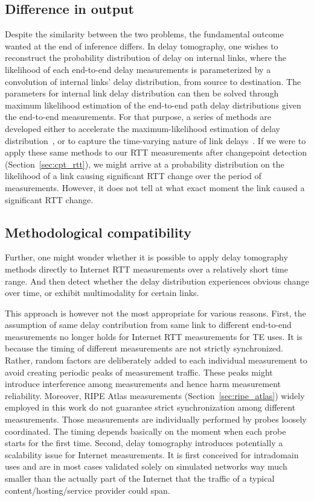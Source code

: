 \subsection{Difference in output}
Despite the similarity between the two problems, the fundamental outcome wanted at the end of inference differs.
In delay tomography, one wishes to reconstruct the probability distribution of delay on internal links, where the likelihood of each end-to-end delay measurements is parameterized by a convolution of internal links' delay distribution, from source to destination.
The parameters for internal link delay distribution can then be solved through maximum likelihood estimation of the end-to-end path delay distributions given the end-to-end measurements.
For that purpose, a series of methods are developed either to accelerate the maximum-likelihood estimation of delay distribution~\cite{Liang2003, Tsang2003}, or to capture the time-varying nature of link delays~\cite{Shih2003,Coates2002a,Tsang2003}.
If we were to apply these same methods to our RTT measurements after changepoint detection (Section~\ref{sec:cpt_rtt}), we might arrive at a probability distribution on the likelihood of a link causing significant RTT change over the period of measurements. 
However, it does not tell at what exact moment the link caused a significant RTT change.

\subsection{Methodological compatibility}
Further, one might wonder whether it is possible to apply delay tomography methods directly to Internet RTT measurements over a relatively short time range. 
And then detect whether the delay distribution experiences obvious change over time, or exhibit multimodality for certain links.

This approach is however not the most appropriate for various reasons. First, the assumption of
same delay contribution from same link to different end-to-end measurements no longer holds for Internet RTT measurements for TE uses. 
It is because the timing of different measurements are not strictly synchronized. 
Rather, random factors are deliberately added to each individual measurement to avoid creating periodic peaks of measurement traffic.
These peaks might introduce interference among measurements and hence harm measurement reliability. 
Moreover,  RIPE Atlas measurements (Section~\ref{sec:ripe_atlas}) widely employed in this work do not guarantee strict synchronization among different measurements.
Those measurements are individually performed by probes loosely coordinated. The timing depends basically on the moment when each probe starts for the first time.
Second, delay tomography introduces potentially a scalability issue for Internet measurements.
It is first conceived for intradomain uses and are in most cases validated solely on simulated networks way much smaller than the actually part of the Internet that the traffic of a typical content/hosting/service provider could span.

